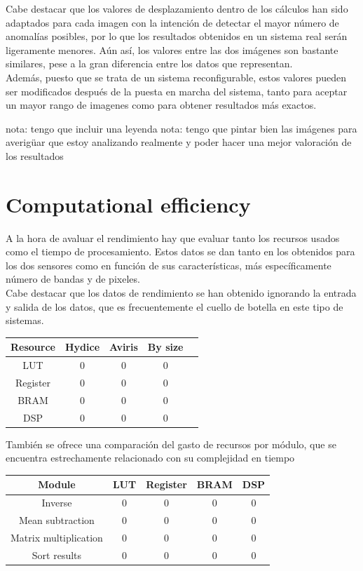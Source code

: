 Cabe destacar que los valores de desplazamiento dentro de los cálculos han sido adaptados para cada imagen con la intención de detectar el mayor número de anomalías posibles, por lo que los resultados obtenidos en un sistema real serán ligeramente menores. Aún así, los valores entre las dos imágenes son bastante similares, pese a la gran diferencia entre los datos que representan.
\\
Además, puesto que se trata de un sistema reconfigurable, estos valores pueden ser modificados después de la puesta en marcha del sistema, tanto para aceptar un mayor rango de imagenes como para obtener resultados más exactos.

nota: tengo que incluir una leyenda
nota: tengo que pintar bien las imágenes para averigüar que estoy analizando realmente y poder hacer una mejor valoración de los resultados

\section{Computational efficiency}
A la hora de avaluar el rendimiento hay que evaluar tanto los recursos usados como el tiempo de procesamiento. Estos datos se dan tanto en los obtenidos para los dos sensores como en función de sus características, más específicamente número de bandas y de pixeles.
\\
Cabe destacar que los datos de rendimiento se han obtenido ignorando la entrada y salida de los datos, que es frecuentemente el cuello de botella en este tipo de sistemas.
\\
\begin{center}
 \begin{tabular}{|c|c|c|c|c|} 
 \hline
 Resource & Hydice & Aviris & By size \\ [0.5ex] 
 \hline\hline
 LUT & 0 & 0 & 0\\ 
 \hline
 Register & 0 & 0 & 0\\ 
 \hline
 BRAM & 0 & 0 & 0\\ 
 \hline
 DSP & 0 & 0 & 0\\ 
 \hline
\end{tabular}
\end{center}

También se ofrece una comparación del gasto de recursos por módulo, que se encuentra estrechamente relacionado con su complejidad en tiempo

\begin{center}
 \begin{tabular}{|c|c|c|c|c|} 
 \hline
 Module & LUT & Register & BRAM & DSP \\ [0.5ex] 
 \hline\hline
 Inverse & 0 & 0 & 0 & 0\\ 
 \hline
 Mean subtraction & 0 & 0 & 0 & 0\\ 
 \hline
 Matrix multiplication & 0 & 0 & 0 & 0\\ 
 \hline
 Sort results & 0 & 0 & 0 & 0\\ 
 \hline
\end{tabular}
\end{center}

